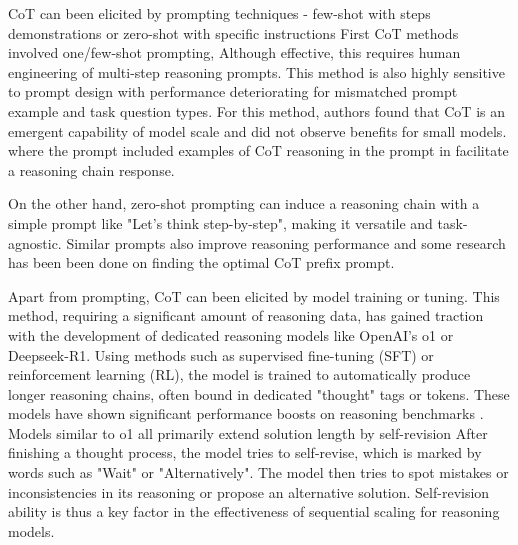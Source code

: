 CoT can been elicited by prompting techniques - few-shot with steps demonstrations or 
zero-shot with specific instructions\cite{wang2024chainofthoughtreasoningprompting}
First CoT methods\cite{wei2023chainofthoughtpromptingelicitsreasoning} involved one/few-shot prompting, 
Although effective, this requires human engineering of multi-step reasoning prompts.
This method is also highly sensitive to prompt design with performance deteriorating 
for mismatched prompt example and task question types\cite{NEURIPS2022_8bb0d291}.
For this method, authors found that CoT is an emergent capability of model scale 
and did not observe benefits for small models\cite{wei2023chainofthoughtpromptingelicitsreasoning}.
where the prompt included examples of CoT reasoning in the prompt in facilitate a reasoning chain response.

On the other hand, zero-shot prompting can induce a reasoning chain with a simple prompt like "Let's think step-by-step",
making it versatile and task-agnostic\cite{NEURIPS2022_8bb0d291}. Similar prompts also improve reasoning performance and 
some research has been been done on finding the optimal CoT prefix prompt.

Apart from prompting, CoT can been elicited by model training or tuning. 
This method, requiring a significant amount of reasoning data\cite{wang2024chainofthoughtreasoningprompting},
has gained traction with the development of dedicated reasoning models like OpenAI's o1 or Deepseek-R1.
Using methods such as supervised fine-tuning (SFT) or reinforcement learning (RL), the model is trained to
automatically produce longer reasoning chains, often bound in dedicated "thought" tags or tokens. These models have shown significant performance boosts on reasoning benchmarks .
Models similar to o1 all primarily extend solution length by self-revision\cite{zeng2025revisitingtesttimescalingo1like}
After finishing a thought process, the model tries to self-revise, which is marked by words such as "Wait" or "Alternatively". 
The model then tries to spot mistakes or inconsistencies in its reasoning or propose an alternative solution. 
Self-revision ability is thus a key factor in the effectiveness of sequential scaling for reasoning models. \cite{zeng2025revisitingtesttimescalingo1like}

